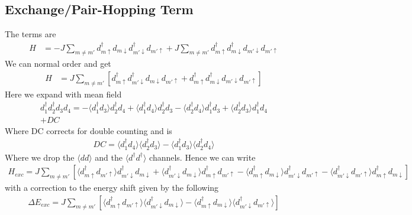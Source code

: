 \documentclass[11pt]{article}
\begin{document}
\subsection{Exchange/Pair-Hopping Term}
The terms are
\begin{align}
    H &= -J \sum_{m \neq m'} d^\dagger_{m\uparrow} d_{m \downarrow}d^\dagger_{m' \downarrow}d_{m'\uparrow}
    + J \sum_{m \neq m'} d^\dagger_{m\uparrow} d^\dagger_{m \downarrow} d_{m' \downarrow} d_{m' \uparrow}
\end{align}
We can normal order and get
\begin{align}
    H &= J \sum_{m \neq m'} \left[d^\dagger_{m\uparrow} d^\dagger_{m' \downarrow}d_{m \downarrow}d_{m'\uparrow}
    + d^\dagger_{m\uparrow} d^\dagger_{m \downarrow} d_{m' \downarrow} d_{m' \uparrow}\right]
\end{align}
Here we expand with mean field
\begin{align}
    d^\dagger_1 d^\dagger_2 d_3 d_4 = 
    -\langle d^\dagger_1 d_3 \rangle d^\dagger_2 d_4
    +\langle d^\dagger_1 d_4 \rangle d_2^\dagger d_3
    -\langle d^\dagger_2 d_4 \rangle d^\dagger_1 d_3
    + \langle d^\dagger_2 d_3 \rangle d^\dagger_1 d_4 \\\nonumber
    + DC
\end{align}
Where DC corrects for double counting and is
\begin{gather}
    DC = \langle d^\dagger_1 d_4\rangle\langle d^\dagger_2 d_3 \rangle 
    - \langle d^\dagger_1 d_3 \rangle \langle d^\dagger_2 d_4 \rangle
\end{gather}
Where we drop the $\langle d d \rangle$ and the $\langle d^\dagger d^\dagger \rangle$ channels.
Hence we can write
\begin{gather}
    H_{exc} = J\sum_{m\neq m'}\left[\langle d^\dagger_{m\uparrow} d_{m'\uparrow} \rangle d^\dagger_{m' \downarrow} d_{m\downarrow}
    + \langle d^\dagger_{m' \downarrow} d_{m\downarrow}\rangle d^\dagger_{m\uparrow}d_{m' \uparrow}
    - \langle d^\dagger_{m \uparrow} d_{m\downarrow}\rangle d^\dagger_{m'\downarrow}d_{m'\uparrow}
    - \langle d^\dagger_{m'\downarrow} d_{m'\uparrow} \rangle d^\dagger_{m\uparrow} d_{m \downarrow}\right]
\end{gather}
with a correction to the energy shift given by the following
\begin{gather}
    \Delta E_{exc} = J\sum_{m\neq m'} \left[
        \langle d^\dagger_{m\uparrow} d_{m'\uparrow}\rangle \langle d^\dagger_{m'\downarrow} d_{m\downarrow}\rangle
        -\langle d^\dagger_{m\uparrow} d_{m\downarrow}\rangle \langle d^\dagger_{m'\downarrow} d_{m'\uparrow}\rangle
    \right]
\end{gather}
\end{document}
